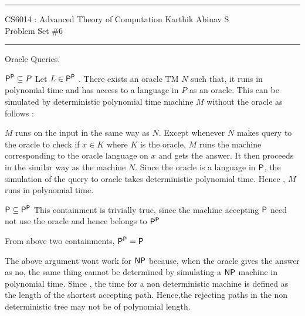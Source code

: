 \documentclass[12pt]{exam}
\begin{document}
\hrule
\vspace{3mm}
\noindent 
{\sf CS6014 : Advanced Theory of Computation  \hfill Karthik Abinav S}
\vspace{3mm}\\
\noindent 
{\sf Problem Set \#6 }
\vspace{3mm}
\hrule

\begin{questions}

\question[10] Oracle Queries.
\begin{solution}
 $\P^\P \subseteq P $ \newline
 Let $L \in \P^\P$ . There exists an oracle TM $N$ such that, it runs in polynomial time and has access to a language in $P$ as an oracle. This
 can be simulated by deterministic polynomial time machine $M$ without the oracle as follows : \newline
 
 $M$ runs on the input in the same way as $N$. Except whenever $N$ makes query to the oracle to check if $x \in K$ where $K$ is the oracle, $M$ runs
 the machine corresponding to the oracle language on $x$ and gets the answer. It then proceeds in the similar way as the machine $N$. Since the oracle is a 
 language in $\P$, the simulation of the query to oracle takes deterministic polynomial time. Hence , $M$ runs in polynomial time.
 
 $\P \subseteq \P^\P$ \newline
 This containment is trivially true, since the machine accepting $\P$ need not use the oracle and hence belongs to $\P^\P$ \newline
 
 From above two containments, $\P^\P = \P$ \newline
 
 The above argument wont work for $\NP$ because, when the oracle gives the answer as no, the same thing cannot be determined by simulating a 
 $\NP$ machine in polynomial time. Since , the time for a non deterministic machine is defined as the length of the shortest accepting path. Hence,the rejecting
 paths in the non deterministic tree may not be of polynomial length. \newline
 

\end{solution}
\end{questions}
\end{document}
